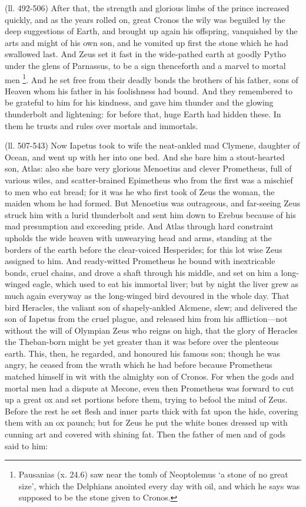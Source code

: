 (ll. 492-506) After that, the strength and glorious limbs of the prince
increased quickly, and as the years rolled on, great Cronos the wily was
beguiled by the deep suggestions of Earth, and brought up again his offspring,
vanquished by the arts and might of his own son, and he vomited up first the
stone which he had swallowed last. And Zeus set it fast in the wide-pathed
earth at goodly Pytho under the glens of Parnassus, to be a sign thenceforth
and a marvel to mortal men \footnote{Pausanias (x. 24.6) saw
near the tomb of Neoptolemus ‘a stone of no great size’, which the
Delphians anointed every day with oil, and which he says was supposed to be the
stone given to Cronos.}. And he set free from their
deadly bonds the brothers of his father, sons of Heaven whom his father in his
foolishness had bound. And they remembered to be grateful to him for his
kindness, and gave him thunder and the glowing thunderbolt and lightening: for
before that, huge Earth had hidden these. In them he trusts and rules over
mortals and immortals.

(ll. 507-543) Now Iapetus took to wife the neat-ankled mad Clymene, daughter of
Ocean, and went up with her into one bed. And she bare him a stout-hearted son,
Atlas: also she bare very glorious Menoetius and clever Prometheus, full of
various wiles, and scatter-brained Epimetheus who from the first was a mischief
to men who eat bread; for it was he who first took of Zeus the woman, the
maiden whom he had formed. But Menoetius was outrageous, and far-seeing Zeus
struck him with a lurid thunderbolt and sent him down to Erebus because of his
mad presumption and exceeding pride. And Atlas through hard constraint upholds
the wide heaven with unwearying head and arms, standing at the borders of the
earth before the clear-voiced Hesperides; for this lot wise Zeus assigned to
him. And ready-witted Prometheus he bound with inextricable bonds, cruel
chains, and drove a shaft through his middle, and set on him a long-winged
eagle, which used to eat his immortal liver; but by night the liver grew as
much again everyway as the long-winged bird devoured in the whole day. That
bird Heracles, the valiant son of shapely-ankled Alcmene, slew; and delivered
the son of Iapetus from the cruel plague, and released him from his
affliction—not without the will of Olympian Zeus who reigns on high, that
the glory of Heracles the Theban-born might be yet greater than it was before
over the plenteous earth. This, then, he regarded, and honoured his famous son;
though he was angry, he ceased from the wrath which he had before because
Prometheus matched himself in wit with the almighty son of Cronos. For when the
gods and mortal men had a dispute at Mecone, even then Prometheus was forward
to cut up a great ox and set portions before them, trying to befool the mind of
Zeus. Before the rest he set flesh and inner parts thick with fat upon the
hide, covering them with an ox paunch; but for Zeus he put the white bones
dressed up with cunning art and covered with shining fat. Then the father of
men and of gods said to him:

